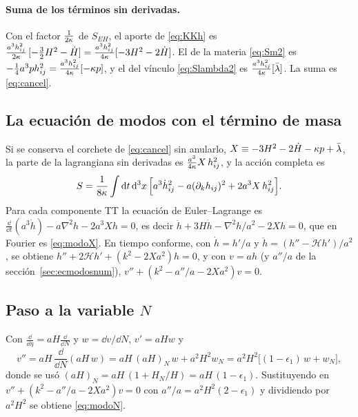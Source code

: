 \paragraph{Suma de los términos sin derivadas.} Con el factor $\frac{1}{2\kappa}$ de $S_{EH}$, el aporte de \eqref{eq:KKh} es $\frac{a^3h_{ij}^2}{2\kappa}\,[-\tfrac32H^2-\dot H]=\frac{a^3h_{ij}^2}{4\kappa}[-3H^2-2\dot H]$. El de la materia \eqref{eq:Sm2} es $-\tfrac14a^3ph_{ij}^2=\frac{a^3h_{ij}^2}{4\kappa}[-\kappa p]$, y el del vínculo \eqref{eq:Slambda2} es $\frac{a^3h_{ij}^2}{4\kappa}[\bar\lambda]$. La suma es \eqref{eq:cancel}.

\subsection{La ecuación de modos con el término de masa}

Si se conserva el corchete de \eqref{eq:cancel} sin anularlo, $X\equiv-3H^2-2\dot H-\kappa p+\bar\lambda$, la parte de la lagrangiana sin derivadas es $\frac{a^3}{4\kappa}X\,h_{ij}^2$, y la acción completa es
\begin{equation}
S=\frac{1}{8\kappa}\int\mathrm d t\,\mathrm d^3x\,\Big[a^3\dot h_{ij}^2-a(\partial_kh_{ij})^2+2a^3X\,h_{ij}^2\Big].
\end{equation}
Para cada componente TT la ecuación de Euler--Lagrange es $\tfrac{\dd}{\dd t}(a^3\dot h)-a\nabla^2h-2a^3Xh=0$, es decir $\ddot h+3H\dot h-\nabla^2h/a^2-2Xh=0$, que en Fourier es \eqref{eq:modoX}. En tiempo conforme, con $\dot h=h'/a$ y $\ddot h=(h''-\mathcal Hh')/a^2$, se obtiene $h''+2\mathcal Hh'+(k^2-2Xa^2)h=0$, y con $v=ah$ (y $a''/a$ de la sección~\ref{sec:ecmodosnum}), $v''+(k^2-a''/a-2Xa^2)v=0$.

\subsection{Paso a la variable $N$}

Con $\tfrac{\dd}{\dd\eta}=aH\tfrac{\dd}{\dd N}$ y $w=\dd v/\dd N$, $v'=aHw$ y
\begin{equation}
v''=aH\,\frac{\dd}{\dd N}(aH\,w)=aH\,(aH)_N\,w+a^2H^2w_N=a^2H^2\big[(1-\epsilon_1)\,w+w_N\big],
\end{equation}
donde se usó $(aH)_N=aH\,(1+H_N/H)=aH\,(1-\epsilon_1)$. Sustituyendo en $v''+(k^2-a''/a-2Xa^2)v=0$ con $a''/a=a^2H^2(2-\epsilon_1)$ y dividiendo por $a^2H^2$ se obtiene \eqref{eq:modoN}.
